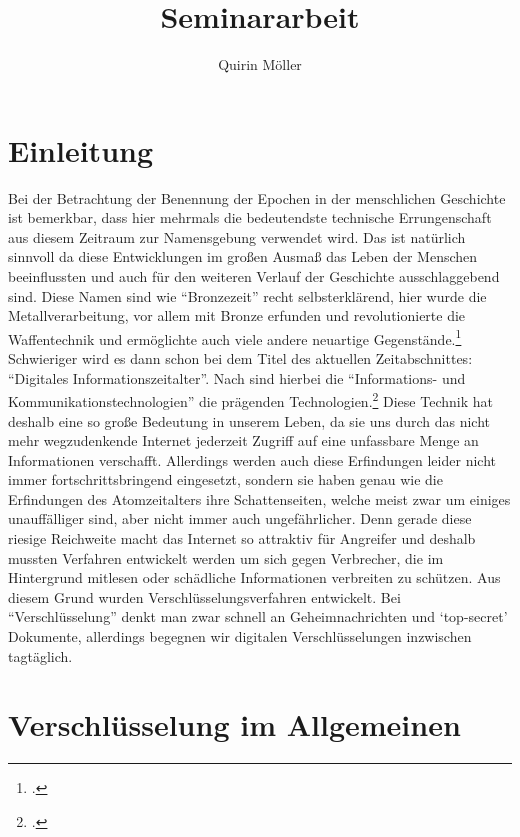 \documentclass{scrarticle} %
\title{Seminararbeit}
\author{Quirin Möller}
\begin{document}
    
    \maketitle
    \newpage
    \tableofcontents
    \newpage

    \section{Einleitung}
    Bei der Betrachtung der Benennung der Epochen in der menschlichen Geschichte ist bemerkbar, dass hier mehrmals die bedeutendste technische Errungenschaft aus diesem Zeitraum zur Namensgebung verwendet wird. Das ist natürlich sinnvoll da diese Entwicklungen im großen Ausmaß das Leben der Menschen beeinflussten und auch für den weiteren Verlauf der Geschichte ausschlaggebend sind. Diese Namen sind  wie \enquote{Bronzezeit} recht selbsterklärend, hier wurde die Metallverarbeitung, vor allem mit Bronze erfunden und revolutionierte die Waffentechnik und ermöglichte auch viele andere neuartige Gegenstände.\footcite{BronzezeitEuropaDeutschland} 
    Schwieriger wird es dann schon bei dem Titel des aktuellen Zeitabschnittes: \enquote{Digitales Informationszeitalter}. Nach  sind hierbei die \enquote{Informations- und Kommunikationstechnologien} die prägenden Technologien.\footcite{jornlengsfeld}
    Diese Technik hat deshalb eine so große Bedeutung in unserem Leben, da sie uns durch das nicht mehr wegzudenkende Internet jederzeit Zugriff auf eine unfassbare Menge an Informationen verschafft. Allerdings werden auch diese Erfindungen leider nicht immer fortschrittsbringend eingesetzt, sondern sie haben genau wie die Erfindungen des Atomzeitalters ihre Schattenseiten, welche meist zwar um einiges unauffälliger sind, aber nicht immer auch ungefährlicher. Denn gerade diese riesige Reichweite macht das Internet so attraktiv für Angreifer und deshalb mussten Verfahren entwickelt werden um sich gegen Verbrecher, die im Hintergrund mitlesen oder schädliche Informationen verbreiten zu schützen. Aus diesem Grund wurden Verschlüsselungsverfahren entwickelt. Bei \enquote{Verschlüsselung} denkt man zwar schnell an Geheimnachrichten und \enquote*{top-secret} Dokumente, allerdings begegnen wir digitalen Verschlüsselungen inzwischen tagtäglich.

    \section[Verschlüsselung allgemein]{Verschlüsselung im Allgemeinen}
\end{document}

